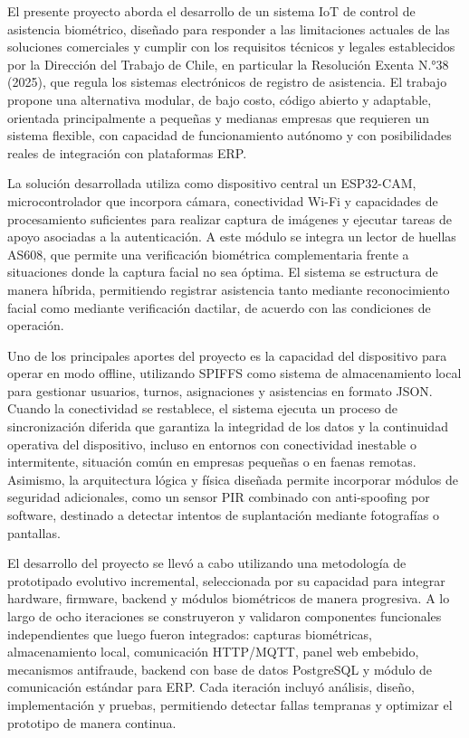 \documentclass{iccmemoria}
\begin{document}
\tableofcontents
\listoffigures
\listoftables

\begin{resumen}
El presente proyecto aborda el desarrollo de un sistema IoT de control de asistencia biométrico, diseñado para responder a las limitaciones actuales de las soluciones comerciales y cumplir con los requisitos técnicos y legales establecidos por la Dirección del Trabajo de Chile, en particular la Resolución Exenta N.°38 (2025), que regula los sistemas electrónicos de registro de asistencia. El trabajo propone una alternativa modular, de bajo costo, código abierto y adaptable, orientada principalmente a pequeñas y medianas empresas que requieren un sistema flexible, con capacidad de funcionamiento autónomo y con posibilidades reales de integración con plataformas ERP.

La solución desarrollada utiliza como dispositivo central un ESP32-CAM, microcontrolador que incorpora cámara, conectividad Wi-Fi y capacidades de procesamiento suficientes para realizar captura de imágenes y ejecutar tareas de apoyo asociadas a la autenticación. A este módulo se integra un lector de huellas AS608, que permite una verificación biométrica complementaria frente a situaciones donde la captura facial no sea óptima. El sistema se estructura de manera híbrida, permitiendo registrar asistencia tanto mediante reconocimiento facial como mediante verificación dactilar, de acuerdo con las condiciones de operación.

Uno de los principales aportes del proyecto es la capacidad del dispositivo para operar en modo offline, utilizando SPIFFS como sistema de almacenamiento local para gestionar usuarios, turnos, asignaciones y asistencias en formato JSON. Cuando la conectividad se restablece, el sistema ejecuta un proceso de sincronización diferida que garantiza la integridad de los datos y la continuidad operativa del dispositivo, incluso en entornos con conectividad inestable o intermitente, situación común en empresas pequeñas o en faenas remotas. Asimismo, la arquitectura lógica y física diseñada permite incorporar módulos de seguridad adicionales, como un sensor PIR combinado con anti-spoofing por software, destinado a detectar intentos de suplantación mediante fotografías o pantallas.

El desarrollo del proyecto se llevó a cabo utilizando una metodología de prototipado evolutivo incremental, seleccionada por su capacidad para integrar hardware, firmware, backend y módulos biométricos de manera progresiva. A lo largo de ocho iteraciones se construyeron y validaron componentes funcionales independientes que luego fueron integrados: capturas biométricas, almacenamiento local, comunicación HTTP/MQTT, panel web embebido, mecanismos antifraude, backend con base de datos PostgreSQL y módulo de comunicación estándar para ERP. Cada iteración incluyó análisis, diseño, implementación y pruebas, permitiendo detectar fallas tempranas y optimizar el prototipo de manera continua.


\end{resumen}
\end{document}
